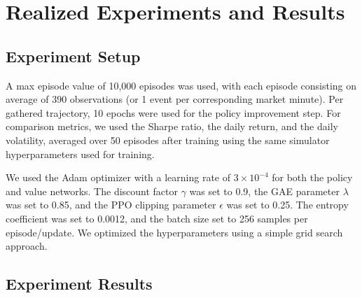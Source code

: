 \section{Realized Experiments and Results}
\label{sec:realized-experiments-and-results}

\subsection{Experiment Setup}
\label{subsec:experiment-setup}

A max episode value of 10,000 episodes was used, with each episode consisting on average of 390 observations (or 1 event per corresponding market minute).
Per gathered trajectory, 10 epochs were used for the policy improvement step.
For comparison metrics, we used the Sharpe ratio, the daily return, and the daily volatility,
averaged over 50 episodes after training using the same simulator hyperparameters used for training.

We used the Adam optimizer with a learning rate of $3 \times 10^{-4}$ for both the policy and value networks.
The discount factor $\gamma$ was set to 0.9, the GAE parameter $\lambda$ was set to 0.85, and the PPO clipping parameter $\epsilon$ was set to 0.25.
The entropy coefficient was set to 0.0012, and the batch size set to 256 samples per episode/update.
We optimized the hyperparameters using a simple grid search approach.

\subsection{Experiment Results}
\label{subsec:experiment-results}




